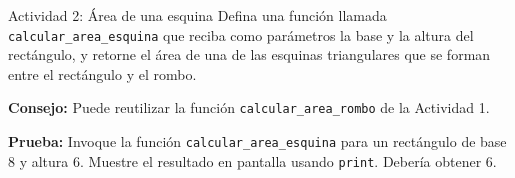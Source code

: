 \documentclass{ip-lab}
\begin{document}
\begin{sectionbox}{Actividad 2: Área de una esquina}
Defina una función llamada \texttt{calcular\_area\_esquina} que reciba como parámetros la base y la altura del rectángulo, y retorne el área de una de las esquinas triangulares que se forman entre el rectángulo y el rombo.

\begin{center}
\end{center}

\pagebreak

\textbf{Consejo:} Puede reutilizar la función \texttt{calcular\_area\_rombo} de la Actividad 1.

\textbf{Prueba:} Invoque la función \texttt{calcular\_area\_esquina} para un rectángulo de base 8 y altura 6. Muestre el resultado en pantalla usando \texttt{print}. Debería obtener 6.
\end{sectionbox}
\end{document}
